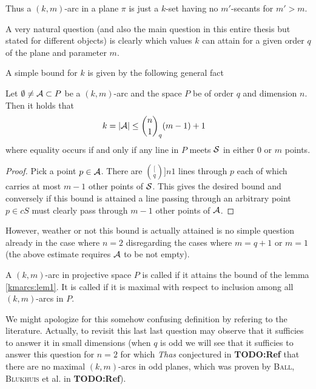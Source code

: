 \documentclass[a4paper]{article}
\begin{document}
\begin{remark}
    Thus a $(k,m)$-arc in a plane $\pi$ is just a $k$-set having no $m'$-secants for $m'>m$.
\end{remark}

A very natural question (and also the main question in this entire thesis but stated for different objects) is clearly which values $k$ can attain for a given order $q$ of the plane and parameter $m$.

A simple bound for $k$ is given by the following general fact

\begin{lemma}\label{kmarcs:lem1}
    Let $\emptyset\neq\mathcal{A}\subset P$ be a $(k,m)$-arc and the space $P$ be of order $q$ and dimension $n$.
    Then it holds that
    \begin{align}
        k=\card{\cA} & \leq \binom[q]{n}{1}(m-1)+1
    \end{align}
    where equality occurs if and only if any line in $P$ meets $\mathcal{S}$ in either $0$ or $m$ points. 
\end{lemma}

\begin{proof}
    Pick a point $p\in\mathcal{A}$. There are $\binom[q]{n}{1}$ lines through $p$ each of which carries at most $m-1$ other points of $\mathcal{S}$.
    This gives the desired bound and conversely if this bound is attained a line passing through an arbitrary point $p\in cS$ must clearly pass through $m-1$ other points of $\mathcal{A}$.
\end{proof}

However, weather or not this bound is actually attained is no simple question already in the case where $n=2$ disregarding the cases where $m=q+1$ or $m=1$ (the above estimate requires $\mathcal{A}$ to be not empty). 

\begin{definition}
    A $(k,m)$-arc in projective space $P$ is called  if it attains the bound of the lemma \ref{kmarcs:lem1}.
    It is called  if it is maximal with respect to inclusion among all $(k,m)$-arcs in $P$.
\end{definition}

We might apologize for this somehow confusing definition by refering to the literature. Actually, to revisit this last last question
may observe that it sufficies to answer it in small dimensions (when $q$ is odd we will see that it sufficies to answer this question for $n=2$ for which \emph{Thas} conjectured in \textbf{TODO:Ref} that there are no maximal $(k,m)$-arcs in odd planes, which was proven by \textsc{Ball}, \textsc{Blukhuis} et al. in \textbf{TODO:Ref}).
\end{document}
